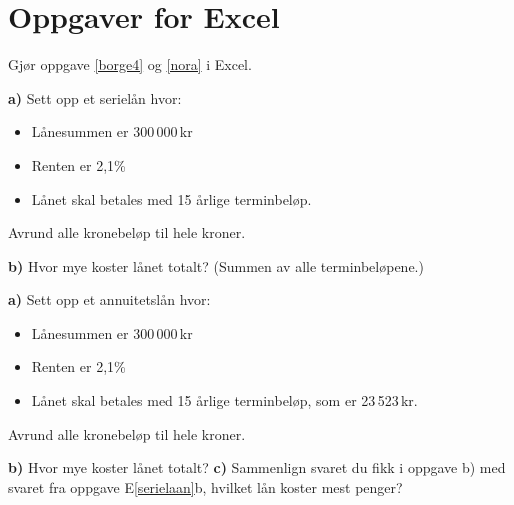 



{} 
\section*{Oppgaver for Excel}

Gjør oppgave \ref{borge4} og \ref{nora} i Excel.

\textbf{a)} Sett opp et serielån hvor:
\begin{itemize}
	\item Lånesummen er 300\,000\,kr
	\item Renten er 2,1\%
	\item Lånet skal betales med 15 årlige terminbeløp.
\end{itemize}
Avrund alle kronebeløp til hele kroner.\os

\textbf{b)} Hvor mye koster lånet totalt? (Summen av alle terminbeløpene.)

\textbf{a)} Sett opp et annuitetslån hvor:
\begin{itemize}
	\item Lånesummen er 300\,000\,kr
	\item Renten er 2,1\%
	\item Lånet skal betales med 15 årlige terminbeløp, som er 23\,523\,kr.
\end{itemize}
Avrund alle kronebeløp til hele kroner.\os

\textbf{b)} Hvor mye koster lånet totalt? \os
\textbf{c)} Sammenlign svaret du fikk i oppgave b) med svaret fra oppgave E\ref{serielaan}b, hvilket lån koster mest penger?\os

